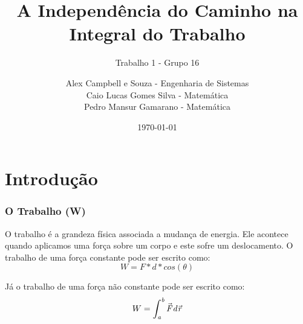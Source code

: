 \documentclass{beamer}
\title{A Independência do Caminho na Integral do Trabalho}
\subtitle{Trabalho 1 - Grupo 16}
\author [Alex, Caio, Pedro]{
    \small Alex Campbell e Souza - Engenharia de Sistemas \\ 
    Caio Lucas Gomes Silva - Matemática \\ 
    Pedro Mansur Gamarano - Matemática
}
\institute[]{
    \large UFMG \\
    \footnotesize Universidade Federal de Minas Gerais \\
    \small Fundamentos de Eletromagnetismo
}
\date{\today}
\def\vec{\mathaccent "017E\relax }
\begin{document}
\frame{\titlepage}

\frame{\tableofcontents}

\section{Introdução}
\begin{frame}
    \frametitle{O Trabalho (W)}
    
    O trabalho é a grandeza física associada a mudança de energia. 
    Ele acontece quando aplicamos uma força sobre um corpo e este sofre um deslocamento. 
    O trabalho de uma força constante pode ser escrito como: 
    \begin{equation}\label{eq:trabalho-constante}
    W = F * d * cos(\theta)
    \end{equation}

    Já o trabalho de uma força não constante pode ser escrito como: 
    \begin{equation}\label{trabalho-nao-constante}
    W = \mathit{\int_{a}^b \vec{F} d\vec{r}}
    \end{equation}


\end{frame}
\end{document}
